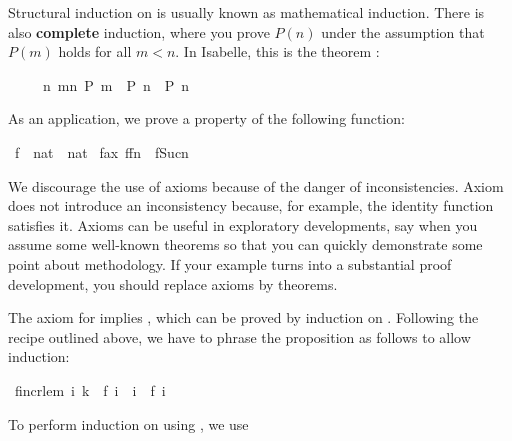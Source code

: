 \begin{isabellebody}
\begin{isamarkuptext}
Structural induction on  is
usually known as mathematical induction. There is also \textbf{complete}
%
induction, where you prove $P(n)$ under the assumption that $P(m)$
holds for all $m<n$. In Isabelle, this is the theorem :
\begin{isabelle}%
\ \ \ \ \ {\isacharparenleft}{\isasymAnd}n{\isachardot}\ {\isasymforall}m{\isacharless}n{\isachardot}\ P\ m\ {\isasymLongrightarrow}\ P\ n{\isacharparenright}\ {\isasymLongrightarrow}\ P\ n%
\end{isabelle}
As an application, we prove a property of the following
function:%
\end{isamarkuptext}%
\isamarkuptrue%
\isamarkupfalse%
\ f\ {\isacharcolon}{\isacharcolon}\ {\isachardoublequoteopen}nat\ {\isasymRightarrow}\ nat{\isachardoublequoteclose}\isanewline
{}\isamarkupfalse%
\ f{\isacharunderscore}ax{\isacharcolon}\ {\isachardoublequoteopen}f{\isacharparenleft}f{\isacharparenleft}n{\isacharparenright}{\isacharparenright}\ {\isacharless}\ f{\isacharparenleft}Suc{\isacharparenleft}n{\isacharparenright}{\isacharparenright}{\isachardoublequoteclose}%
\begin{isamarkuptext}%
\begin{warn}
We discourage the use of axioms because of the danger of
inconsistencies.  Axiom  does
not introduce an inconsistency because, for example, the identity function
satisfies it.  Axioms can be useful in exploratory developments, say when 
you assume some well-known theorems so that you can quickly demonstrate some
point about methodology.  If your example turns into a substantial proof
development, you should replace axioms by theorems.
\end{warn}\noindent
The axiom for  implies , which can
be proved by induction on \mbox{}. Following the recipe outlined
above, we have to phrase the proposition as follows to allow induction:%
\end{isamarkuptext}%
\isamarkuptrue%
\isamarkupfalse%
\ f{\isacharunderscore}incr{\isacharunderscore}lem{\isacharcolon}\ {\isachardoublequoteopen}{\isasymforall}i{\isachardot}\ k\ {\isacharequal}\ f\ i\ {\isasymlongrightarrow}\ i\ {\isasymle}\ f\ i{\isachardoublequoteclose}%
\isadelimproof
%
\endisadelimproof
%
\isatagproof
%
\begin{isamarkuptxt}%
\noindent
To perform induction on  using , we use

\end{isamarkuptxt}
\end{isabellebody}
